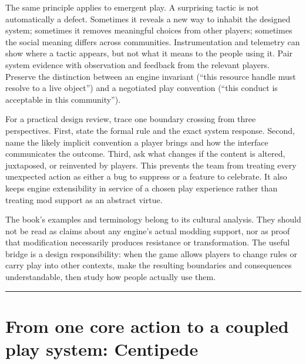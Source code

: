 The same principle applies to emergent play. A surprising tactic is not automatically a defect. Sometimes it reveals a new way to inhabit the designed system; sometimes it removes meaningful choices from other players; sometimes the social meaning differs across communities. Instrumentation and telemetry can show where a tactic appears, but not what it means to the people using it. Pair system evidence with observation and feedback from the relevant players. Preserve the distinction between an engine invariant (``this resource handle must resolve to a live object'') and a negotiated play convention (``this conduct is acceptable in this community'').

For a practical design review, trace one boundary crossing from three perspectives. First, state the formal rule and the exact system response. Second, name the likely implicit convention a player brings and how the interface communicates the outcome. Third, ask what changes if the content is altered, juxtaposed, or reinvented by players. This prevents the team from treating every unexpected action as either a bug to suppress or a feature to celebrate. It also keeps engine extensibility in service of a chosen play experience rather than treating mod support as an abstract virtue.

The book's examples and terminology belong to its cultural analysis. They should not be read as claims about any engine's actual modding support, nor as proof that modification necessarily produces resistance or transformation. The useful bridge is a design responsibility: when the game allows players to change rules or carry play into other contexts, make the resulting boundaries and consequences understandable, then study how people actually use them.

\begin{center}\rule{0.5\linewidth}{0.5pt}\end{center}

\section{From one core action to a coupled play system: Centipede}\label{06-engine-ii-ch046-from-one-core-action-to-a-coupled-play-system-centipede}

\hypertarget{06-engine-ii-ch046-from-one-core-action-to-a-coupled-play-system-centipede}{}

